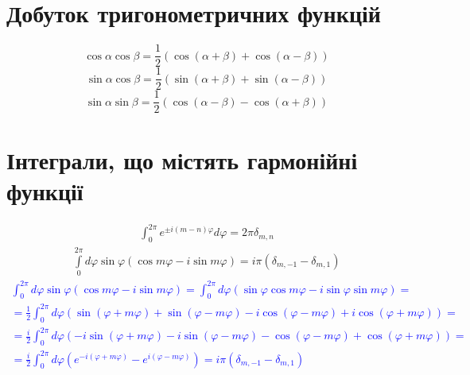 \section{Добуток тригонометричних функцій}
%
\begin{equation}
\cos \alpha \cos \beta = \frac{1}{2} 
\left(  \cos (\alpha + \beta) + \cos (\alpha - \beta) \right)
\end{equation}
%
\begin{equation}
\sin \alpha \cos \beta = \frac{1}{2} 
\left( \sin (\alpha + \beta) + \sin (\alpha - \beta) \right)
\end{equation}
%
\begin{equation}
\sin \alpha \sin \beta = \frac{1}{2} 
\left( \cos (\alpha - \beta) - \cos (\alpha + \beta) \right)
\end{equation}
%
\section{Інтеграли, що містять гармонійні функції}
%
\begin{equation} \begin{aligned} \label{eq:int_exp0}
\int_{0}^{2\pi} e^{\pm i (m-n) \varphi} d \varphi = 2 \pi \delta_{m,n} 
\end{aligned} \end{equation}
%
\begin{equation} \begin{aligned} \label{eq:int_exp1}
\int \limits_{0}^{2\pi} d \varphi \sin \varphi 
\left( \cos m \varphi - i \sin m \varphi \right) = 
i \pi \left( \delta_{m,-1} - \delta_{m,1} \right)
\end{aligned} \end{equation}
%
\textcolor{blue}{ \begin{equation*} \begin{aligned}
\int_{0}^{2\pi} d \varphi \sin \varphi 
\left( \cos m \varphi - i \sin m \varphi \right) = \int_{0}^{2\pi} d \varphi
\left( \sin \varphi \cos m \varphi - i \sin \varphi \sin m \varphi \right) = \\
= \frac{1}{2} \int_{0}^{2\pi} d \varphi \left( \sin (\varphi + m \varphi) + 
\sin (\varphi - m \varphi) - i \cos (\varphi - m \varphi) + 
i \cos (\varphi + m \varphi) \right) = \\
= \frac{i}{2} \int_{0}^{2\pi} d \varphi \left( -i \sin (\varphi + m \varphi) -
i \sin (\varphi - m \varphi) - \cos (\varphi - m \varphi) + 
\cos (\varphi + m \varphi) \right) = \\
= \frac{i}{2} \int_{0}^{2\pi} d \varphi \left( e^{-i (\varphi + m \varphi)} - 
e^{i (\varphi - m \varphi)} \right) = 
i \pi \left( \delta_{m,-1} - \delta_{m,1} \right)
\end{aligned} \end{equation*} }
